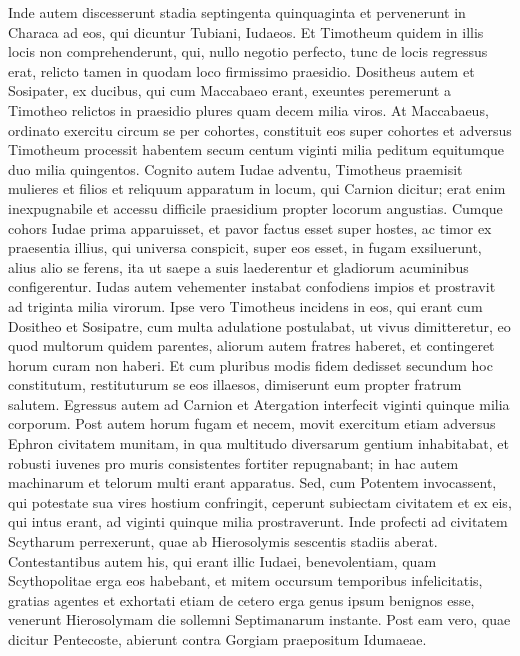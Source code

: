 \begin{biblechapter}
\begin{biblechapter}
\begin{biblechapter}
\begin{biblechapter}
\begin{biblechapter}
\begin{biblechapter}
\begin{biblechapter}
\begin{biblechapter}
\begin{biblechapter}
\begin{biblechapter}
\begin{biblechapter}
\begin{biblechapter}
 \verse Inde autem discesserunt stadia septingenta quinquaginta et pervenerunt in Characa ad eos, qui dicuntur Tubiani, Iudaeos. 
\verse Et Timotheum quidem in illis locis non comprehenderunt, qui, nullo negotio perfecto, tunc de locis regressus erat, relicto tamen in quodam loco firmissimo praesidio. 
\verse Dositheus autem et Sosipater, ex ducibus, qui cum Maccabaeo erant, exeuntes peremerunt a Timotheo relictos in praesidio plures quam decem milia viros. 
 \verse At Maccabaeus, ordinato exercitu circum se per cohortes, constituit eos super cohortes et adversus Timotheum processit habentem secum centum viginti milia peditum equitumque duo milia quingentos. 
\verse Cognito autem Iudae adventu, Timotheus praemisit mulieres et filios et reliquum apparatum in locum, qui Carnion dicitur; erat enim inexpugnabile et accessu difficile praesidium propter locorum angustias. 
\verse Cumque cohors Iudae prima apparuisset, et pavor factus esset super hostes, ac timor ex praesentia illius, qui universa conspicit, super eos esset, in fugam exsiluerunt, alius alio se ferens, ita ut saepe a suis laederentur et gladiorum acuminibus configerentur. 
\verse Iudas autem vehementer instabat confodiens impios et prostravit ad triginta milia virorum. 
\verse Ipse vero Timotheus incidens in eos, qui erant cum Dositheo et Sosipatre, cum multa adulatione postulabat, ut vivus dimitteretur, eo quod multorum quidem parentes, aliorum autem fratres haberet, et contingeret horum curam non haberi. 
\verse Et cum pluribus modis fidem dedisset secundum hoc constitutum, restituturum se eos illaesos, dimiserunt eum propter fratrum salutem.
 \verse Egressus autem ad Carnion et Atergation interfecit viginti quinque milia corporum. 
\verse Post autem horum fugam et necem, movit exercitum etiam adversus Ephron civitatem munitam, in qua multitudo diversarum gentium inhabitabat, et robusti iuvenes pro muris consistentes fortiter repugnabant; in hac autem machinarum et telorum multi erant apparatus. 
\verse Sed, cum Potentem invocassent, qui potestate sua vires hostium confringit, ceperunt subiectam civitatem et ex eis, qui intus erant, ad viginti quinque milia prostraverunt. 
 \verse Inde profecti ad civitatem Scytharum perrexerunt, quae ab Hierosolymis sescentis stadiis aberat. 
\verse Contestantibus autem his, qui erant illic Iudaei, benevolentiam, quam Scythopolitae erga eos habebant, et mitem occursum temporibus infelicitatis, 
\verse gratias agentes et exhortati etiam de cetero erga genus ipsum benignos esse, venerunt Hierosolymam die sollemni Septimanarum instante.
 \verse Post eam vero, quae dicitur Pentecoste, abierunt contra Gorgiam praepositum Idumaeae. 

\end{biblechapter}
\end{biblechapter}
\end{biblechapter}
\end{biblechapter}
\end{biblechapter}
\end{biblechapter}
\end{biblechapter}
\end{biblechapter}
\end{biblechapter}
\end{biblechapter}
\end{biblechapter}
\end{biblechapter}
